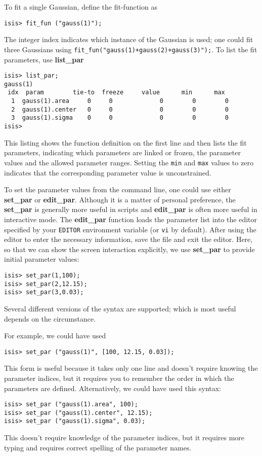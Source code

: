 \documentclass{book}
\begin{document}
{To fit a single Gaussian, define the fit-function as
\begin{verbatim}
isis> fit_fun ("gauss(1)");
\end{verbatim}
The integer index indicates which instance of the Gaussian is
used; one could fit three Gaussians using
\verb|fit_fun("gauss(1)+gauss(2)+gauss(3)");|. To list the fit
parameters, use {\bf list\_par}
\begin{verbatim}
isis> list_par;
gauss(1)
 idx  param        tie-to  freeze     value      min      max
  1  gauss(1).area     0     0             0        0        0
  2  gauss(1).center   0     0             0        0        0
  3  gauss(1).sigma    0     0             0        0        0
isis>
\end{verbatim}
This listing shows the function definition on the first line and
then lists the fit parameters, indicating which parameters are
linked or frozen, the parameter values and the allowed parameter
ranges.  Setting the {\tt min} and {\tt max} values to zero
indicates that the corresponding parameter value is unconstrained.

To set the parameter values from the command line, one could use
either {\bf set\_par} or {\bf edit\_par}.  Although it is a matter
of personal preference, the {\bf set\_par} is generally more
useful in scripts and {\bf edit\_par} is often more useful in
interactive mode.  The {\bf edit\_par} function loads the
parameter list into the editor specified by your {\tt EDITOR}
environment variable (or {\tt vi} by default). After using the
editor to enter the necessary information, save the file and exit
the editor. Here, so that we can show the screen interaction
explicitly, we use {\bf set\_par} to provide initial parameter
values:
\begin{verbatim}
isis> set_par(1,100);
isis> set_par(2,12.15);
isis> set_par(3,0.03);
\end{verbatim}
Several different versions of the syntax are supported; which
is most useful depends on the circumstance.

For example, we could have used
\begin{verbatim}
isis> set_par ("gauss(1)", [100, 12.15, 0.03]);
\end{verbatim}
This form is useful because it takes only one line and doesn't
require knowing the parameter indices, but it requires you to
remember the order in which the parameters are defined.
Alternatively, we could have used this syntax:
\begin{verbatim}
isis> set_par ("gauss(1).area", 100);
isis> set_par ("gauss(1).center", 12.15);
isis> set_par ("gauss(1).sigma", 0.03);
\end{verbatim}
This doesn't require knowledge of the parameter indices, but it
requires more typing and requires correct spelling of the
parameter names.

}
\end{document}
